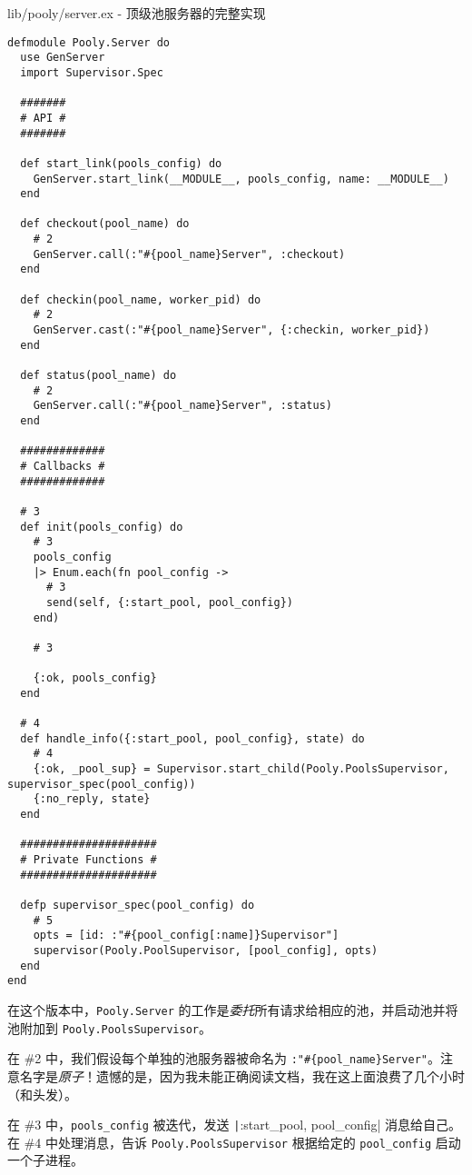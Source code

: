 \begin{code}{lib/pooly/server.ex - 顶级池服务器的完整实现}

\begin{verbatim}
defmodule Pooly.Server do
  use GenServer
  import Supervisor.Spec

  ####### 
  # API #
  #######

  def start_link(pools_config) do
    GenServer.start_link(__MODULE__, pools_config, name: __MODULE__)
  end

  def checkout(pool_name) do
    # 2
    GenServer.call(:"#{pool_name}Server", :checkout)
  end

  def checkin(pool_name, worker_pid) do
    # 2
    GenServer.cast(:"#{pool_name}Server", {:checkin, worker_pid})
  end

  def status(pool_name) do
    # 2
    GenServer.call(:"#{pool_name}Server", :status)
  end

  #############
  # Callbacks #
  #############

  # 3
  def init(pools_config) do
    # 3
    pools_config
    |> Enum.each(fn pool_config ->
      # 3
      send(self, {:start_pool, pool_config})
    end)

    # 3

    {:ok, pools_config}
  end

  # 4
  def handle_info({:start_pool, pool_config}, state) do
    # 4
    {:ok, _pool_sup} = Supervisor.start_child(Pooly.PoolsSupervisor, supervisor_spec(pool_config))
    {:no_reply, state}
  end

  #####################
  # Private Functions #
  #####################

  defp supervisor_spec(pool_config) do
    # 5
    opts = [id: :"#{pool_config[:name]}Supervisor"]
    supervisor(Pooly.PoolSupervisor, [pool_config], opts)
  end
end
\end{verbatim}
\end{code}

在这个版本中，\texttt{Pooly.Server}
的工作是\emph{委托}所有请求给相应的池，并启动池并将池附加到
\texttt{Pooly.PoolsSupervisor}。

在 \#2 中，我们假设每个单独的池服务器被命名为
\texttt{:"\#\{pool\_name\}Server"}。注意名字是\emph{原子}！遗憾的是，因为我未能正确阅读文档，我在这上面浪费了几个小时（和头发）。

在 \#3 中，\texttt{pools\_config} 被迭代，发送
\texttt|{:start_pool, pool\_config}| 消息给自己。在
\#4 中处理消息，告诉 \texttt{Pooly.PoolsSupervisor}
根据给定的 \texttt{pool\_config} 启动一个子进程。

